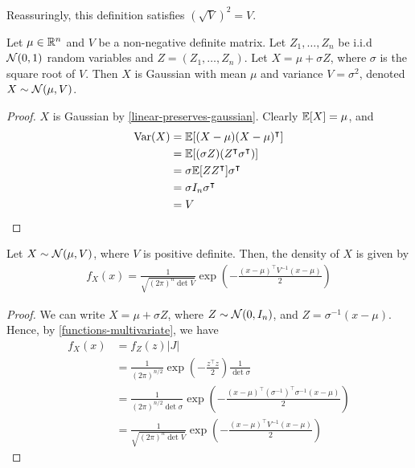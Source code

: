 \documentclass{../template/note}
\begin{document}
    \begin{remark*}
        Reassuringly, this definition satisfies \((\sqrt V)^2 = V\).
    \end{remark*}
    
    \begin{lemma}
        Let \(\mu \in \mathbb R^n\) and \(V\) be a non-negative definite matrix. Let \(Z_1, \dots, Z_n\) be i.i.d \(\mathcal{N}(0, 1)\) random variables and \(Z = (Z_1, \dots, Z_n)\). Let \(X = \mu + \sigma Z\), where \(\sigma\) is the square root of \(V\). Then \(X\) is Gaussian with mean \(\mu\) and variance \(V = \sigma^2\), denoted \(X \sim \mathcal{N}(\mu, V)\).
    \end{lemma}
    
    \begin{proof}
        \(X\) is Gaussian by \cref{linear-preserves-gaussian}. Clearly \(\mathbb E[X] = \mu\), and
        \begin{align*}
            \operatorname{Var}(X) &= \mathbb E[(X-\mu)(X-\mu)^\intercal] \\
            &= \mathbb E[(\sigma Z)(Z^\intercal \sigma^\intercal)] \\
            &= \sigma \mathbb E[ZZ^\intercal] \sigma^\intercal \\
            &= \sigma I_n \sigma^\intercal \\
            &= V
        \end{align*}
    \end{proof}
    
    \begin{proposition}
        Let \(X \sim \mathcal{N}(\mu, V)\), where \(V\) is positive definite. Then, the density of \(X\) is given by
        \begin{align*}
            f_X(x) = \frac 1{\sqrt{(2\pi)^n \det V}} \exp\left(-\frac{(x-\mu)^\intercal V^{-1} (x-\mu)} 2\right)
        \end{align*}
    \end{proposition}
    
    \begin{proof}
        We can write \(X = \mu + \sigma Z\), where \(Z \sim \mathcal{N}(0, I_n)\), and \(Z = \sigma^{-1}(x-\mu)\). Hence, by \cref{functions-multivariate}, we have
        \begin{align*}
            f_X(x) &= f_Z(z) |J| \\
            &= \frac 1{(2\pi)^{n/2}}\exp\left(-\frac{z^\intercal z}2\right) \frac 1{\det \sigma} \\
            &= \frac 1{(2\pi)^{n/2} \det \sigma}\exp\left(-\frac{(x-\mu)^\intercal (\sigma^{-1})^\intercal \sigma^{-1} (x-\mu)}2\right) \\
            &= \frac 1{\sqrt{(2\pi)^n \det V}} \exp\left(-\frac{(x-\mu)^\intercal V^{-1} (x-\mu)} 2\right)
        \end{align*}
    \end{proof}
    
\end{document}
